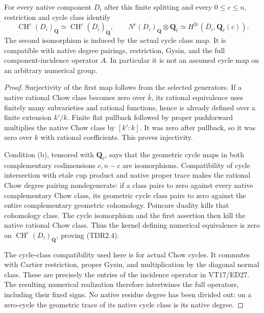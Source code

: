 \begin{lemma}
\label{sc2td:native}
For every native component $D_i$ after this finite splitting and every
$0\leq c\leq n$, restriction and cycle class identify
\[
 \operatorname{CH}^c(D_i)_{\mathbf Q}
       \simeq \operatorname{CH}^c(\overline D_i)_{\mathbf Q},
 \qquad
 N^c(D_i)_{\mathbf Q}\otimes\mathbf Q_\ell
       \simeq H^{2c}(\overline D_i,\mathbf Q_\ell(c)).
 \tag{TDR2.4}
\]
The second isomorphism is induced by the actual cycle class map.
It is compatible with native degree pairings, restriction, Gysin,
and the full component-incidence operator $A$. In particular it is
not an assumed cycle map on an arbitrary numerical group.
\end{lemma}

\begin{proof}
Surjectivity of the first map follows from the selected generators.
If a native rational Chow class becomes zero over $\bar k$, its
rational equivalence uses finitely many subvarieties and rational
functions, hence is already defined over a finite extension $k'/k$.
Finite flat pullback followed by proper pushforward multiplies the
native Chow class by $[k':k]$. It was zero after pullback, so it was
zero over $k$ with rational coefficients. This proves injectivity.

Condition (b), tensored with $\mathbf Q_\ell$, says that the geometric
cycle maps in both complementary codimensions $c,n-c$ are isomorphisms.
Compatibility of cycle intersection with etale cup product and native
proper trace makes the rational Chow degree pairing nondegenerate:
if a class pairs to zero against every native complementary Chow class,
its geometric cycle class pairs to zero against the entire complementary
geometric cohomology. Poincare duality kills that cohomology class.
The cycle isomorphism and the first assertion then kill the native
rational Chow class. Thus the kernel defining numerical equivalence is
zero on $\operatorname{CH}^c(D_i)_{\mathbf Q}$, proving (TDR2.4).

The cycle-class compatibility used here is for actual Chow cycles.
It commutes with Cartier restriction, proper Gysin, and multiplication
by the diagonal normal class. These are precisely the entries of the
incidence operator in VT17/ED27. The resulting numerical realization
therefore intertwines the full operators, including their fixed signs.
No native residue degree has been divided out: on a zero-cycle the
geometric trace of its native cycle class is its native degree.
\end{proof}

